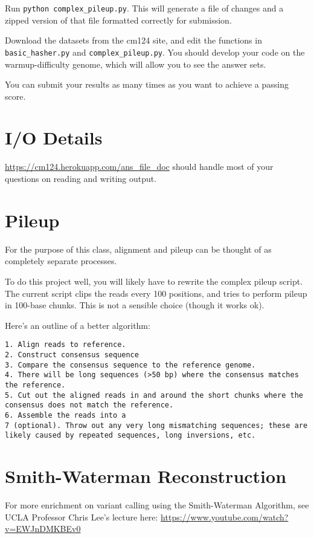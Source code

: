 \documentclass{article}
\begin{document}
Run \verb|python complex_pileup.py|. This will generate a file of changes and a zipped version of that file formatted correctly for submission.

Download the datasets from the cm124 site, and edit the functions in \verb|basic_hasher.py| and 
\verb|complex_pileup.py|. You should develop your code on the warmup-difficulty genome, which will allow you to see the answer sets.
 
You can submit your results as many times as you want to achieve a passing score.

\section*{I/O Details}
\url{https://cm124.herokuapp.com/ans_file_doc} should handle most of your questions on reading and writing output.

\section*{Pileup}

For the purpose of this class, alignment and pileup can be thought of as completely separate processes.

To do this project well, you will likely have to rewrite the complex pileup script. The current script clips the reads every 100 positions, and tries to perform pileup in 100-base chunks. This is not a sensible choice (though it works ok).

Here's an outline of a better algorithm:

\begin{verbatim}
1. Align reads to reference.
2. Construct consensus sequence
3. Compare the consensus sequence to the reference genome.
4. There will be long sequences (>50 bp) where the consensus matches the reference.
5. Cut out the aligned reads in and around the short chunks where the consensus does not match the reference.
6. Assemble the reads into a 
7 (optional). Throw out any very long mismatching sequences; these are likely caused by repeated sequences, long inversions, etc.
\end{verbatim}


\section*{Smith-Waterman Reconstruction}

For more enrichment on variant calling using the Smith-Waterman Algorithm, see UCLA Professor Chris Lee's lecture here: \url{https://www.youtube.com/watch?v=EWJnDMKBEv0}
\end{document}
